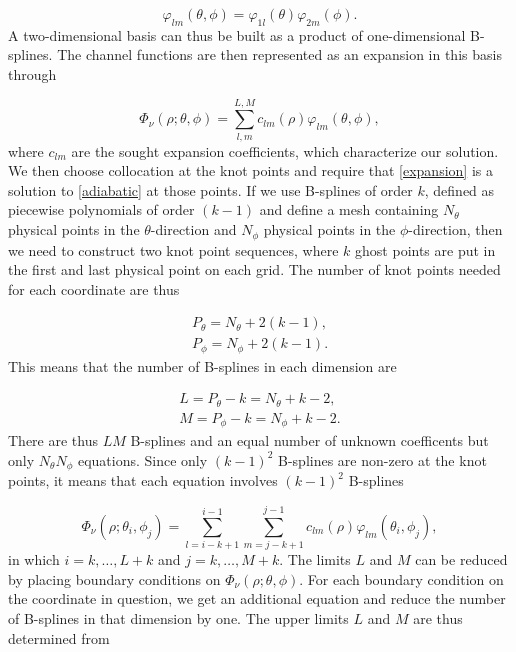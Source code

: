 \begin{equation}
\varphi_{lm} (\theta,\phi) = \varphi_{1l}(\theta)\varphi_{2m}(\phi).
\end{equation}
A two-dimensional basis can thus be built as a product of one-dimensional B-splines. The channel functions are then represented as an expansion in this basis through  

\begin{equation}\label{expansion}
\Phi_{\nu}(\rho;\theta,\phi) = \sum_{l,m}^{L,M} c_{lm}(\rho)\varphi_{lm} (\theta,\phi),
\end{equation}
where $c_{lm}$ are the sought expansion coefficients, which characterize our solution. We then choose collocation at the knot points and require that \eqref{expansion} is a solution to \eqref{adiabatic} at those points.  If we use B-splines of order $k$, defined as piecewise polynomials of order $(k-1)$ and define a mesh containing $N_{\theta}$ physical points in the $\theta$-direction and $N_{\phi}$ physical points in the $\phi$-direction, then we need to construct two knot point sequences, where $k$ ghost points are put in the first and last physical point on each grid. The number of knot points needed for each coordinate are thus

\begin{equation}
\begin{aligned}
P_{\theta}=N_{\theta}+2(k-1),\\
P_{\phi}=N_{\phi}+2(k-1).
\end{aligned}
\end{equation}
This means that the number of B-splines in each dimension are

\begin{equation}
\begin{aligned}
L = P_{\theta}-k=N_{\theta}+k-2,\\
M = P_{\phi}-k = N_{\phi}+k-2.
\end{aligned}
\end{equation}
There are thus $LM$ B-splines and an equal number of unknown coefficents but only $N_{\theta}N_{\phi}$ equations. Since only $(k-1)^2$ B-splines are non-zero at the knot points, it means that each equation involves $(k-1)^2$ B-splines

\begin{equation}
\Phi_{\nu}(\rho;\theta_i,\phi_j) = \sum_{l=i-k+1}^{i-1}\sum_{m=j-k+1}^{j-1} c_{lm}(\rho)\varphi_{lm} (\theta_{i},\phi_{j}),
\end{equation}
in which $i = k,\ldots,L+k$ and $j = k,\ldots,M+k$.
The limits $L$ and $M$ can be reduced by placing boundary conditions on $\Phi_{\nu}(\rho;\theta,\phi)$. For each boundary condition on the coordinate in question, we get an additional equation and reduce the number of B-splines in that dimension by one. The upper limits $L$ and $M$ are thus determined from 


